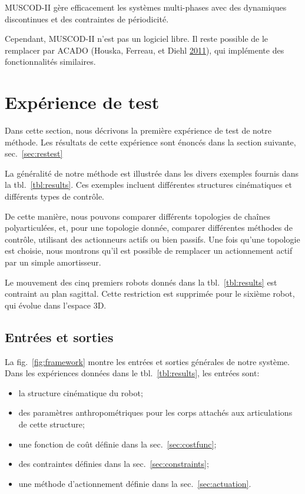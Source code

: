 \documentclass[french,A4paper,]{book}
\providecommand{\tightlist}{%
  \setlength{\itemsep}{0pt}\setlength{\parskip}{0pt}}
\begin{document}
MUSCOD-II gère efficacement les systèmes multi-phases avec des
dynamiques discontinues et des contraintes de périodicité.

Cependant, MUSCOD-II n'est pas un logiciel libre. Il reste possible de
le remplacer par ACADO (Houska, Ferreau, et Diehl
\protect\hyperlink{ref-acado}{2011}), qui implémente des fonctionnalités
similaires.

\section{Expérience de test}\label{sec:exptest}

Dans cette section, nous décrivons la première expérience de test de
notre méthode. Les résultats de cette expérience sont énoncés dans la
section suivante, sec.~\ref{sec:restest}

La généralité de notre méthode est illustrée dans les divers exemples
fournis dans la tbl.~\ref{tbl:results}. Ces exemples incluent
différentes structures cinématiques et différents types de contrôle.

De cette manière, nous pouvons comparer différents topologies de chaînes
polyarticulées, et, pour une topologie donnée, comparer différentes
méthodes de contrôle, utilisant des actionneurs actifs ou bien passifs.
Une fois qu'une topologie est choisie, nous montrons qu'il est possible
de remplacer un actionnement actif par un simple amortisseur.

Le mouvement des cinq premiers robots donnés dans la
tbl.~\ref{tbl:results} est contraint au plan sagittal. Cette restriction
est supprimée pour le sixième robot, qui évolue dans l'espace 3D.

\subsection{Entrées et sorties}\label{entruxe9es-et-sorties}

La fig.~\ref{fig:framework} montre les entrées et sorties générales de
notre système. Dans les expériences données dans le
tbl.~\ref{tbl:results}, les entrées sont:

\begin{itemize}
\tightlist
\item
  la structure cinématique du robot;
\item
  des paramètres anthropométriques pour les corps attachés aux
  articulations de cette structure;
\item
  une fonction de coût définie dans la sec.~\ref{sec:costfunc};
\item
  des contraintes définies dans la sec.~\ref{sec:constraints};
\item
  une méthode d'actionnement définie dans la sec.~\ref{sec:actuation}.
\end{itemize}
\end{document}
